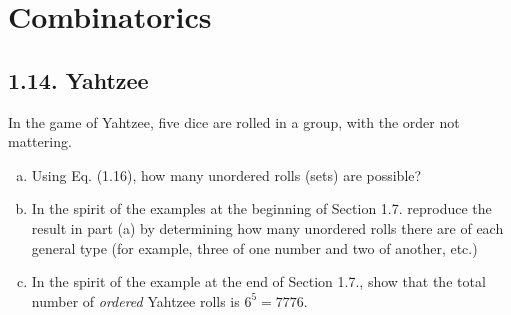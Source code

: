     \chapter{Combinatorics}

    \section*{1.14. Yahtzee}
    In the game of Yahtzee, five dice are rolled in a group, with the order not mattering.

    \begin{enumerate}[(a)]
        \item Using Eq. (1.16), how many unordered rolls (sets) are possible?

        \item In the spirit of the examples at the beginning of Section 1.7. reproduce the
            result in part (a) by determining how many unordered rolls there are
            of each general type (for example, three of one number and two of another, etc.)

        \item In the spirit of the example at the end of Section 1.7., show that the total
            number of \emph{ordered} Yahtzee rolls is $6^5 = 7776$.
    \end{enumerate}

    \vspace{2em}

